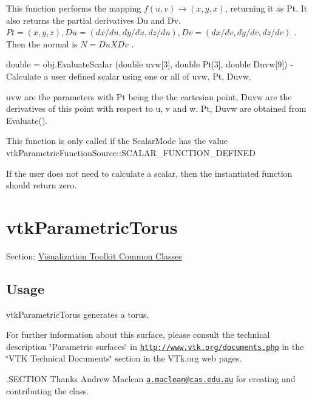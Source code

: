 \begin{DoxyItemize}
This function performs the mapping $f(u,v) \rightarrow (x,y,x)$, returning it as Pt. It also returns the partial derivatives Du and Dv. $Pt = (x, y, z), Du = (dx/du, dy/du, dz/du), Dv = (dx/dv, dy/dv, dz/dv)$ . Then the normal is $N = Du X Dv$ .  
\item {\ttfamily double = obj.\-Evaluate\-Scalar (double uvw\mbox{[}3\mbox{]}, double Pt\mbox{[}3\mbox{]}, double Duvw\mbox{[}9\mbox{]})} -\/ Calculate a user defined scalar using one or all of uvw, Pt, Duvw.

uvw are the parameters with Pt being the the cartesian point, Duvw are the derivatives of this point with respect to u, v and w. Pt, Duvw are obtained from Evaluate().

This function is only called if the Scalar\-Mode has the value vtk\-Parametric\-Function\-Source\-::\-S\-C\-A\-L\-A\-R\-\_\-\-F\-U\-N\-C\-T\-I\-O\-N\-\_\-\-D\-E\-F\-I\-N\-E\-D

If the user does not need to calculate a scalar, then the instantiated function should return zero.


\end{DoxyItemize}\hypertarget{vtkcommon_vtkparametrictorus}{}\section{vtk\-Parametric\-Torus}\label{vtkcommon_vtkparametrictorus}
Section\-: \hyperlink{sec_vtkcommon}{Visualization Toolkit Common Classes} \hypertarget{vtkwidgets_vtkxyplotwidget_Usage}{}\subsection{Usage}\label{vtkwidgets_vtkxyplotwidget_Usage}
vtk\-Parametric\-Torus generates a torus.

For further information about this surface, please consult the technical description \char`\"{}\-Parametric surfaces\char`\"{} in \href{http://www.vtk.org/documents.php}{\tt http\-://www.\-vtk.\-org/documents.\-php} in the \char`\"{}\-V\-T\-K Technical Documents\char`\"{} section in the V\-Tk.\-org web pages.

.S\-E\-C\-T\-I\-O\-N Thanks Andrew Maclean \href{mailto:a.maclean@cas.edu.au}{\tt a.\-maclean@cas.\-edu.\-au} for creating and contributing the class.

